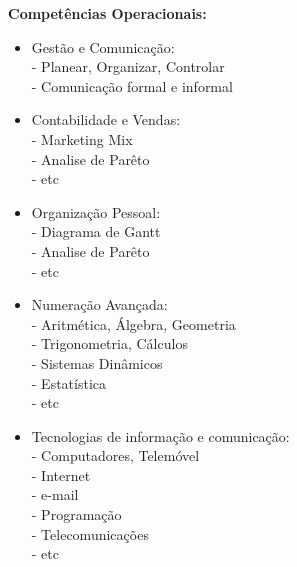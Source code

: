 \begin{minipage}[t]{.5\linewidth}
\qquad \textbf{Competências Operacionais:}
\begin{itemize}
\setlength\itemsep{-0.8em}
\item Gestão e Comunicação:\\
- Planear, Organizar, Controlar\\
- Comunicação formal e informal\\
\item Contabilidade e Vendas:\\
- Marketing Mix\\
- Analise de Parêto\\
- etc\\
\item Organização Pessoal:\\
- Diagrama de Gantt\\
- Analise de Parêto\\
- etc\\
\item Numeração Avançada:\\
- Aritmética, Álgebra, Geometria\\
- Trigonometria, Cálculos\\
- Sistemas Dinâmicos\\
- Estatística\\
- etc\\
\item Tecnologias de informação e comunicação:\\
- Computadores, Telemóvel\\
- Internet\\
- e-mail\\
- Programação\\
- Telecomunicações\\
- etc\\
\end{itemize}
\end{minipage}
